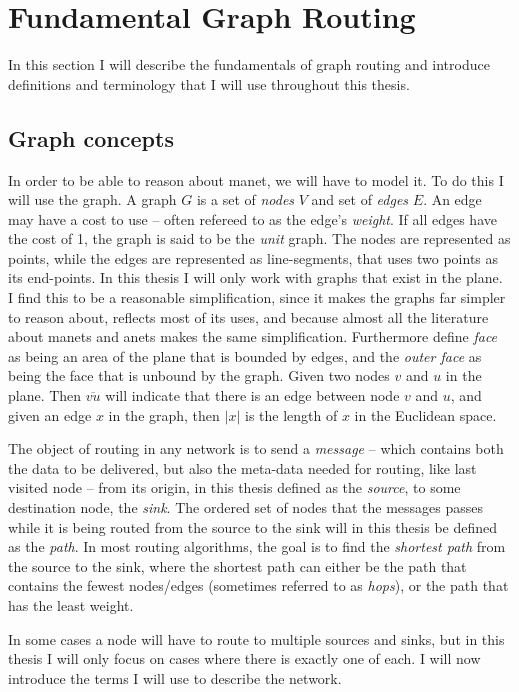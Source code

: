 \section{Fundamental Graph Routing}
\label{section:fundamental_graph_routing}
In this section I will describe the fundamentals of graph routing and introduce definitions and terminology that I will use throughout this thesis.

\subsection{Graph concepts}
\label{section:graph_concepts}
In order to be able to reason about \ac{manet}, we will have to model it. To do this I will use the graph. A graph $G$ is a set of \emph{nodes} $V$ and set of \emph{edges} $E$. An edge may have a cost to use -- often refereed to as the edge's \emph{weight}. If all edges have the cost of 1, the graph is said to be the \emph{unit} graph. The nodes are represented as points, while the edges are represented as line-segments, that uses two points as its end-points. In this thesis I will only work with graphs that exist in the plane. I find this to be a reasonable simplification, since it makes the graphs far simpler to reason about, reflects most of its uses, and because almost all the literature about \acp{manet} and \acp{anet} makes the same simplification. Furthermore define \emph{face} as being an area of the plane that is bounded by edges, and the \emph{outer face} as being the face that is unbound by the graph. Given two nodes $v$ and $u$ in the plane. Then $\overline{vu}$ will indicate that there is an edge between node $v$ and $u$, and given an edge $x$ in the graph, then $|x|$ is the length of $x$ in the Euclidean space.

The object of routing in any network is to send a \emph{message} -- which contains both the data to be delivered, but also the meta-data needed for routing, like last visited node -- from its origin, in this thesis defined as the \emph{source}, to some destination node, the \emph{sink}. The ordered set of nodes that the messages passes while it is being routed from the source to the sink will in this thesis be defined as the \emph{path}. In most routing algorithms, the goal is to find the \emph{shortest path} from the source to the sink, where the shortest path can either be the path that contains the fewest nodes/edges (sometimes referred to as \emph{hops}), or the path that has the least weight.

In some cases a node will have to route to  multiple sources and sinks, but in this thesis I will only focus on cases where there is exactly one of each. I will now introduce the terms I will use to describe the network.

